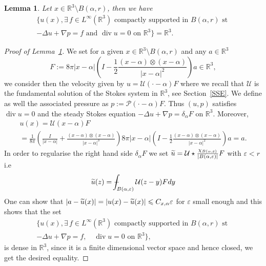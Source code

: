 \documentclass[10pt]{amsart}
\newtheorem{lemm}[theo]{Lemma}\newtheorem{prop}[theo]{Proposition}\newtheorem{coro}[theo]{Corollary}\newtheorem{conj}[theo]{Conjecture}
\theoremstyle{definition}\newtheorem{defi}[theo]{Definition}\newtheorem{rema}[theo]{Remark}\newtheorem{exam}[theo]{Example}\newtheorem{exem}[theo]{Example}\newtheorem{nota}[theo]{Notation}
\newcommand{\R}{\mathbb{R}}
\newcommand{\clP}{\mathcal{P}}
\newcommand{\clU}{\mathcal{U}}
\renewcommand{\leq}{\leqslant}
\renewcommand{\div}{\operatorname{div}}
\newcommand*\Xint[1]{\mathchoice {\XXint\displaystyle\textstyle{#1}} {\XXint\textstyle\scriptstyle{#1}} {\XXint\scriptstyle\scriptscriptstyle{#1}} {\XXint\scriptscriptstyle\scriptscriptstyle{#1}}
\!\int}
\newcommand*\XXint[3]{{\setbox0=\hbox{$#1{#2#3}{\int}$ }\vcenter{\hbox{$#2#3$ }}\kern-.6\wd0}}
\newcommand*\dashint{\Xint-}
\let\oldtilde\tilde
\renewcommand*{\tilde}[1]{\mathchoice{\widetilde{#1}}{\widetilde{#1}}{\oldtilde{#1}}{\oldtilde{#1}}}
\let\oldexists\exists
\renewcommand*{\exists}{\mathrel{\oldexists}}
\begin{document}
\begin{lemm}\label{lemme3}
Let $ x \in \R^3 \setminus B(\alpha,r)$, then we have
\begin{multline*}
\Big \{ u(x),\exists \, f\in L^\infty\left(\R^3\right) \text{ compactly supported in } B(\alpha,r) \text{ st } \\ -\Delta u+\nabla p =f \text{ and } \div u= 0 \text{ on } \R^3 \Big \}=\R^3.
\end{multline*}
\end{lemm}
\begin{proof}[Proof of Lemma~\ref{lemme3}]
We set for a given $x \in \R^3 \setminus B(\alpha,r)$ and any $a \in \R^3$
\[
F:=8\pi|x-\alpha | \left(I-\frac{1}{2}\frac{(x-\alpha) \otimes (x-\alpha)}{|x-\alpha|^2} \right)a \in \R^3,
\]
we consider then the velocity given by $u=\clU(\cdot-\alpha)F$ where we recall that $\clU $ is the fundamental solution of the Stokes system in $\R^3$, see Section~\ref{SSE}. We define as well the associated pressure as $p:=\clP(\cdot-\alpha)F $. Thus $(u,p)$ satisfies $\div u= 0 $ and the steady Stokes equation $-\Delta u+\nabla p =\delta_\alpha F $ on $\R^3$. Moreover,
\begin{multline*}
u(x) = \clU (x-\alpha) F
\\ =\frac{1}{8\pi} \left(\frac{I}{|x-\alpha|}+\frac{(x-\alpha) \otimes (x-\alpha)}{|x-\alpha|^3} \right) 8\pi|x-\alpha| \left(I-\frac{1}{2}\frac{(x-\alpha) \otimes (x-\alpha)}{|x-\alpha|^2} \right)a = a.
\end{multline*}
In order to regularise the right hand side $\delta_{\alpha}F$ we set $\tilde{u} =\clU \star \frac{\chi_{B(\alpha,\varepsilon)}}{|B(\alpha,\varepsilon)|}F$ with $\varepsilon<r$ i.e
\[
\tilde{u}(z)= \dashint_{B(\alpha,\varepsilon)}\clU(z-y)F dy
\]
One can show that $ |a-\tilde{u}(x)|=|u(x)-\tilde{u}(x)|\leq C_{x,\alpha} \varepsilon$ for $\varepsilon$ small enough and this shows that the set
\begin{multline*}
\Big \{ u(x),\exists \, f\in L^\infty\left(\R^3\right) \text{ compactly supported in } B(\alpha,r) \text{ st } \\ -\Delta u+\nabla p =f, \quad \div u= 0 \text{ on } \R^3 \Big \},
\end{multline*}
is dense in $\R^3$, since it is a finite dimensional vector space and hence closed, we get the desired equality.
\end{proof}
\end{document}
